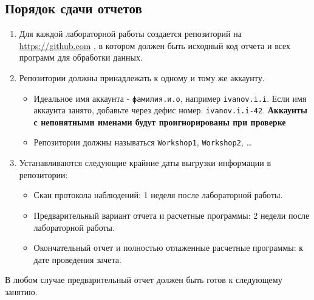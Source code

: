 \subsection{Порядок сдачи отчетов}
\begin{enumerate}
    \item Для каждой лабораторной работы создается репозиторий на \url{https://github.com} \cite{repo}, в котором должен быть исходный код отчета и всех программ для обработки данных.
    \item Репозитории должны принадлежать к одному и тому же аккаунту.
    \begin{itemize}
        \item Идеальное имя аккаунта - \verb"фамилия.и.о", например \verb"ivanov.i.i". Если имя аккаунта занято, добавьте через дефис номер: \verb"ivanov.i.i-42". \textbf{Аккаунты с непонятными именами будут проигнорированы при проверке}
        \item Репозитории должны называться \verb"Workshop1", \verb"Workshop2", \dots
    \end{itemize}
    \item Устанавливаются следующие крайние даты выгрузки информации в репозитории:
    \begin{itemize}
        \item Скан протокола наблюдений: 1 неделя после лабораторной работы.
        \item Предварительный вариант отчета и расчетные программы: 2 недели после лабораторной работы.
        \item Окончательный отчет и полностью отлаженные расчетные программы: к дате проведения зачета.
    \end{itemize}
\end{enumerate}

В любом случае предварительный отчет должен быть готов к следующему занятию.

